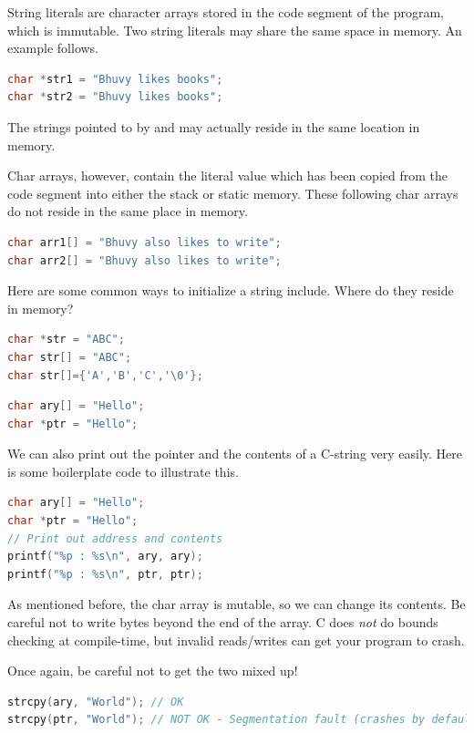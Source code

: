 String literals are character arrays stored in the code segment of the program, which is immutable.
Two string literals may share the same space in memory.
An example follows.

\begin{lstlisting}[language=C]
char *str1 = "Bhuvy likes books";
char *str2 = "Bhuvy likes books";
\end{lstlisting}

The strings pointed to by  and  may actually reside in the same location in memory.

Char arrays, however, contain the literal value which has been copied from the code segment into either the stack or static memory.
These following char arrays do not reside in the same place in memory.

\begin{lstlisting}[language=C]
char arr1[] = "Bhuvy also likes to write";
char arr2[] = "Bhuvy also likes to write";
\end{lstlisting}

Here are some common ways to initialize a string include. Where do they reside in memory?

\begin{lstlisting}[language=C]
char *str = "ABC";
char str[] = "ABC";
char str[]={'A','B','C','\0'};
\end{lstlisting}

\begin{lstlisting}[language=C]
char ary[] = "Hello";
char *ptr = "Hello";
\end{lstlisting}

We can also print out the pointer and the contents of a C-string very easily. Here is some boilerplate code to illustrate this.

\begin{lstlisting}[language=C]
char ary[] = "Hello";
char *ptr = "Hello";
// Print out address and contents
printf("%p : %s\n", ary, ary);
printf("%p : %s\n", ptr, ptr);
\end{lstlisting}

As mentioned before, the char array is mutable, so we can change its contents.
Be careful not to write bytes beyond the end of the array. C does \emph{not} do bounds checking at compile-time, but invalid reads/writes can get your program to crash.

Once again, be careful not to get the two mixed up!

\begin{lstlisting}[language=C]
strcpy(ary, "World"); // OK
strcpy(ptr, "World"); // NOT OK - Segmentation fault (crashes by default; unless SIGSEGV is blocked)
\end{lstlisting}

